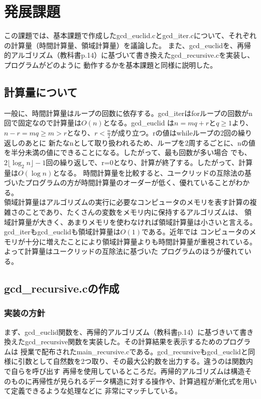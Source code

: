 \documentclass{ltjsarticle}
\begin{document}
\section{発展課題}
この課題では、基本課題で作成したgcd\_euclid.cとgcd\_iter.cについて、それぞれの計算量（時間計算量、領域計算量）を議論した。
また、gcd\_euclidを、再帰的アルゴリズム（教科書p.14）に基づいて書き換えたgcd\_recursive.cを実装し、プログラムがどのように
動作するかを基本課題と同様に説明した。
\subsection{計算量について}
一般に、時間計算量はループの回数に依存する。gcd\_iterはforループの回数がn回で固定なので計算量は$O(n)$となる。gcd\_euclid
は$n = mq+r$と$q \geq 1$より、$n-r = mq \geq m > r$となり、$r < \frac{n}{2}$が成り立つ。rの値はwhileループの2回の繰り返しのあとに
新たなnとして取り扱われるため、ループを2周するごとに、nの値を半分未満の値にできることになる。したがって、最も回数が多い場合
でも、$2\lfloor \log_2 n \rfloor - 1$回の繰り返しで、r=0となり、計算が終了する。したがって、計算量は$O(\log n)$となる。
時間計算量を比較すると、ユークリッドの互除法の基づいたプログラムの方が時間計算量のオーダーが低く、優れていることがわかる。\\ \indent
領域計算量はアルゴリズムの実行に必要なコンピュータのメモリを表す計算の複雑さのことであり、たくさんの変数をメモリ内に保持するアルゴリズムは、
領域計算量が大きく、あまりメモリを使わなければ領域計算量は小さいと言える。gcd\_iterもgcd\_euclidも領域計算量は$O(1)$である。近年では
コンピュータのメモリが十分に増えたことにより領域計算量よりも時間計算量が重視されている。よって計算量はユークリッドの互除法に基づいた
プログラムのほうが優れている。
\subsection{gcd\_recursive.cの作成}
\subsubsection{実装の方針}\label{subsubsec:実装の方針2}
まず、gcd\_euclid関数を、再帰的アルゴリズム（教科書p.14）に基づきいて書き換えたgcd\_recursive関数を実装した。その計算結果を表示するためのプログラムは
授業で配布されたmain\_recursive.cである。gcd\_recursiveもgcd\_euclidと同様に引数として自然数を2つ取り、その最大公約数を出力する。違うのは関数内で自らを呼び出す
再帰を使用しているところだ。再帰的アルゴリズムは構造そのものに再帰性が見られるデータ構造に対する操作や、計算過程が漸化式を用いて定義できるような処理などに
非常にマッチしている。
\end{document}
